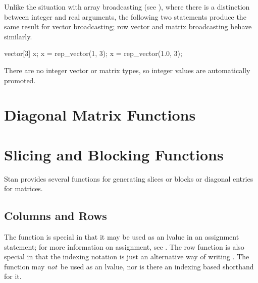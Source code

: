 Unlike the situation with array broadcasting (see ), where there is a
distinction between integer and real arguments, the following two
statements produce the same result for vector broadcasting;  row vector
and matrix broadcasting behave similarly.
%
\begin{stancode}
vector[3] x;
x = rep_vector(1, 3);
x = rep_vector(1.0, 3);  
\end{stancode}
%
There are no integer vector or matrix types, so integer values are
automatically promoted.


\section{Diagonal Matrix Functions}

\begin{description}
%
%
%
\end{description}



\section{Slicing and Blocking Functions}

Stan provides several functions for generating slices or blocks or
diagonal entries for matrices.

\subsection{Columns and Rows}

\begin{description}
%
%
%
\end{description}

The  function is special in that it may be used as an lvalue
in an assignment statement; for more information on assignment, see
.  The row function is also special
in that the indexing notation  is just an alternative way
of writing .  The  function may {\it not}\, be
used as an lvalue, nor is there an indexing based shorthand for it.


